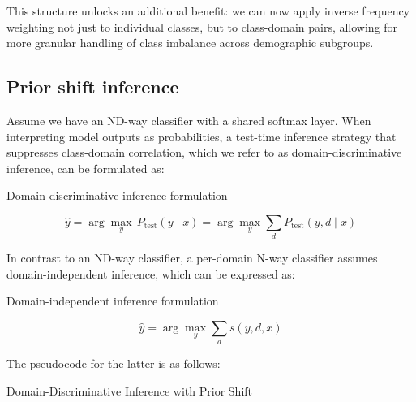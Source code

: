 This structure unlocks an additional benefit: we can now apply inverse frequency weighting not just to individual classes, but to class-domain pairs, allowing for more granular handling of class imbalance across demographic subgroups.

\subsection{Prior shift inference}

Assume we have an ND-way classifier with a shared softmax layer. When interpreting model outputs as probabilities, a test-time inference strategy that suppresses class-domain correlation, which we refer to as domain-discriminative inference, can be formulated as:

\begin{myequation}[H]
\caption{Domain-discriminative inference formulation}
\label{eq:domain_disc_inf}
\[
\hat{y} = \arg\max_{y} \, P_{\text{test}}(y \mid x)
= \arg\max_{y} \sum_{d} P_{\text{test}}(y, d \mid x)
\]
\end{myequation}


In contrast to an ND-way classifier, a per-domain N-way classifier assumes domain-independent inference, which can be expressed as:

\begin{myequation}[H]
\caption{Domain-independent inference formulation}
\label{eq:domain_indep_inf}
\[
\hat{y} = \arg\max_{y} \sum_{d} s(y, d, x)
\]
\end{myequation}


The pseudocode for the latter is as follows:
\begin{algorithm}[H]
\caption{Domain-Discriminative Inference with Prior Shift}
\label{alg:prior_shift}
\begin{algorithmic}[1]
    \State Initialize $\texttt{prior\_weights} \gets$ predefined vector of length $N \cdot D$
    \State $\texttt{prior\_weights} \gets \texttt{prior\_weights} / 100$
    \State $\texttt{probs} \gets \texttt{Softmax(outputs)} \cdot \texttt{prior\_weights}$

        \State Extract domain-specific class probs:
        \State \quad $\texttt{domain\_probs[d]} \gets \texttt{probs[:, d} \cdot \texttt{num\_classes} : (d{+}1) \cdot \texttt{num\_classes}]}$
    \EndFor

    \State $\texttt{summed\_probs} \gets \sum\limits_{d=1}^{D} \texttt{domain\_probs[d]}$ (element-wise sum over domains)
    \State $\texttt{predictions} \gets \arg\max\limits_{y} \texttt{summed\_probs}$ 
    \State \Return \texttt{predictions}
\EndFunction
\end{algorithmic}
\end{algorithm}





